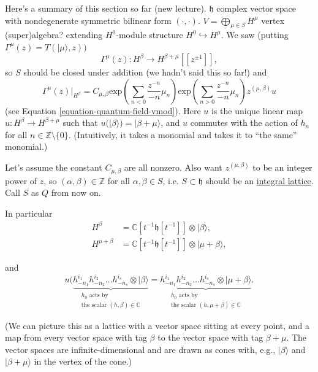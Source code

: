 \medskip\noindent
Here's a summary of this section so far (new lecture).
$\mathfrak{h}$ complex vector space with 
nondegenerate symmetric bilinear form $(\cdot,\cdot)$.
$V=\bigoplus_{\mu \in S}H^\mu$ vertex (super)algebra?
extending $H^0$-module structure $H^0 \hookrightarrow H^\mu$.
We saw (putting $\Gamma^\mu(z)=T(|\mu\rangle,z))$
$$
\Gamma^\mu(z):H^\beta \to H^{\beta+\mu}[[z^{\pm 1}]],
$$
so $S$ should be closed under addition
(we hadn't said this so far!)
and
\begin{equation}
\label{equation-quantum-field-vmod2}
\Gamma^\mu(z)|_{H^\beta}=
C_{\mu,\beta}
\text{exp}\left(\sum_{n<0}\frac{z^{-n}}{-n}\mu_n\right)
\text{exp}\left(\sum_{n>0}\frac{z^{-n}}{-n}\mu_n\right)
z^{(\mu,\beta)}u
\end{equation}
(see Equation \ref{equation-quantum-field-vmod}).
Here $u$ is the unique linear map $u:H^\beta \to H^{\beta+\mu}$ 
such that $u(|\beta\rangle)=|\beta+\mu\rangle$,
and $u$ commutes with the action of $h_n$ for all 
$n \in \mathbb{Z}\setminus \{0\}$.
(Intuitively, it takes a monomial and takes it to
``the same'' monomial.)

Let's assume the constant $C_{\mu,\beta}$ are all nonzero.
Also want $z^{(\mu,\beta)}$ to be an integer power of $z$,
so $(\alpha,\beta) \in \mathbb{Z}$ for all $\alpha,\beta \in S$,
i.e. $S \subset \mathfrak{h}$ should be an \underline{integral lattice}.
Call $S$ as $Q$ from now on.

In particular
\begin{align*}
H^\beta&=\mathbb{C}[t^{-1}\mathfrak{h}[t^{-1}]]\otimes|\beta\rangle,\\
H^{\mu+\beta}&=\mathbb{C}[t^{-1}\mathfrak{h}[t^{-1}]]\otimes |\mu+\beta\rangle,
\end{align*}

\noindent
and
$$
u(\underbrace{
h^{i_1}_{-n_1}h^{i_2}_{-n_2}\ldots h^{i_s}_{-n_s}\otimes |\beta\rangle}
_{\substack{h_0\text{ acts by} \\ \text{the scalar }(h,\beta) \in \mathbb{C}}}
=\underbrace{
h^{i_1}_{-n_1}h^{i_2}_{-n_2}\ldots h^{i_s}_{-n_s}\otimes | \mu+\beta\rangle}
_{\substack{h_0\text{ acts by} \\ \text{the scalar }(h,\mu+\beta) 
\in \mathbb{C}}}.
$$

\noindent
(We can picture this as a lattice with a vector space
sitting at every point, and a map from every vector space
with tag $\beta$ to the vector space with tag $\beta+\mu$.
The vector spaces are infinite-dimensional and 
are drawn as cones with, e.g., $|\beta\rangle$ and $|\beta+\mu\rangle$ 
in the vertex of the cone.)

